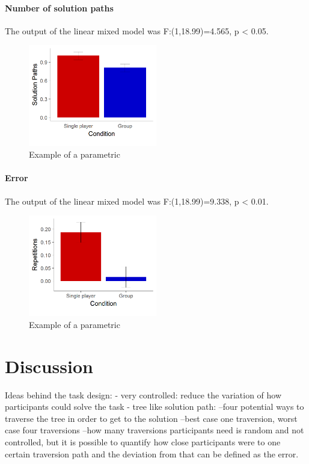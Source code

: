 \documentclass{article}
\begin{document}
\paragraph{Number of solution paths}

The output of the linear mixed model was F:(1,18.99)=4.565, p < 0.05.


\begin{figure}[h]
\centering
\includegraphics[width=0.5\textwidth]{results_solution_paths}
\caption{Example of a parametric }
\end{figure}

\paragraph{Error}

The output of the linear mixed model was F:(1,18.99)=9.338, p < 0.01.


\begin{figure}[h]
\centering
\includegraphics[width=0.5\textwidth]{results_un_error}
\caption{Example of a parametric }
\end{figure}


\section{Discussion}
Ideas behind the task design:	
- very controlled: reduce the variation of how participants could solve the task
- tree like solution path: 
--four potential ways to traverse the tree in order to get to the solution
--best case one traversion, worst case four traversions
--how many traversions participants need is random and not controlled, but it is possible to quantify how close participants were to one certain traversion path and the deviation from that can be defined as the error.



\end{document}
